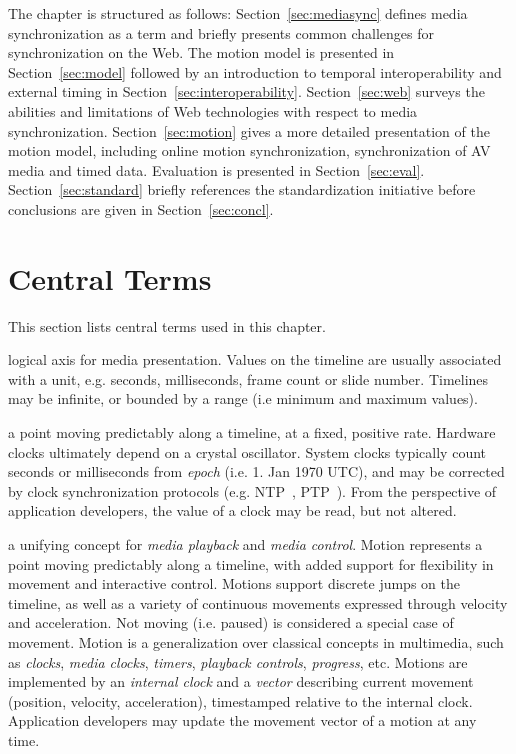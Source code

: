\documentclass[graybox]{svmult}
\begin{document}
The chapter is structured as follows: Section~\ref{sec:mediasync} defines media
synchronization as a term and briefly presents common challenges for
synchronization on the Web. The motion model is presented in
Section~\ref{sec:model} followed by an introduction to temporal interoperability
and external timing in Section~\ref{sec:interoperability}. Section~\ref{sec:web} surveys the abilities and limitations of Web technologies with respect to media synchronization.
Section~\ref{sec:motion} gives a more detailed presentation of the motion model, including online motion synchronization, synchronization of AV media and timed data. Evaluation is presented in Section~\ref{sec:eval}.
Section~\ref{sec:standard} briefly references the standardization initiative before
conclusions are given in Section~\ref{sec:concl}.



\section{Central Terms}
\label{sec:terms}
This section lists central terms used in this chapter.


logical axis for media presentation. Values on the timeline are usually
associated with a unit, e.g. seconds, milliseconds, frame count or slide
number. Timelines may be infinite, or bounded by a range (i.e minimum and
maximum values).


a point moving predictably along a timeline, at a fixed, positive rate.
Hardware clocks ultimately depend on a crystal oscillator. System clocks
typically count seconds or milliseconds from \emph{epoch} (i.e. 1. Jan 1970
UTC), and may be corrected by clock synchronization protocols (e.g.
NTP~\cite{ntp}, PTP~\cite{ptp}). From the perspective of application
developers, the value of a clock may be read, but not altered.


a unifying concept for \emph{media playback} and \emph{media control}. Motion
represents a point moving predictably along a timeline, with added support for
flexibility in movement and interactive control. Motions support discrete
jumps on the timeline, as well as a variety of continuous movements expressed
through velocity and acceleration. Not moving (i.e. paused) is considered a
special case of movement. Motion is a generalization over classical concepts
in multimedia, such as \emph{clocks}, \emph{media clocks}, \emph{timers},
\emph{playback controls}, \emph{progress}, etc. Motions are implemented by an
\emph{internal clock} and a \emph{vector} describing current movement (position,
velocity, acceleration), timestamped relative to the internal clock.
Application developers may update the movement vector of a motion at any time.
\end{document}
